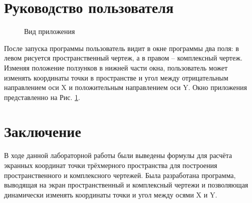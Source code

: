 \documentclass[13pt]{extarticle}
\begin{document}
\section{Руководство пользователя}
	\begin{figure}[h]
		\caption{Вид приложения}
		\label{fig:appScr}
	
	\end{figure}
После запуска программы пользователь видит в окне программы два поля: в левом рисуется пространственный чертеж, а в правом -- комплексный чертеж. Изменяя положение ползунков в нижней части окна, пользователь может изменять координаты точки в пространстве и угол между отрицательным направлением оси X и положительным направлением оси Y. Окно приложения представленно на Рис. \ref{fig:appScr}.

\section{Заключение}
В ходе данной лабораторной работы были выведены формулы для расчёта экранных координат точки трёхмерного пространства для построения пространственного и комплексного чертежей. Была разработана программа, выводящая на экран пространственный и комплексный чертежи и позволяющая динамически изменять координаты точки и угол между осями X и Y.
 
\end{document}
